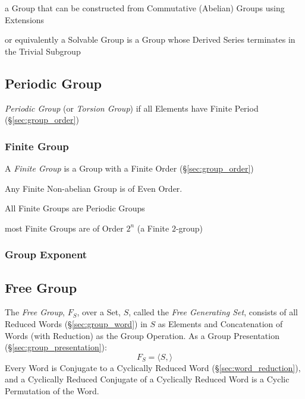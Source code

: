 a Group that can be constructed from Commutative (Abelian) Groups using
Extensions

or equivalently a Solvable Group is a Group whose Derived Series terminates in
the Trivial Subgroup



\subsection{Periodic Group}\label{sec:periodic_group}

\emph{Periodic Group} (or \emph{Torsion Group}) if all Elements have
Finite Period (\S\ref{sec:group_order})



\subsubsection{Finite Group}\label{sec:finite_group}

A \emph{Finite Group} is a Group with a Finite Order (\S\ref{sec:group_order})

Any Finite Non-abelian Group is of Even Order.

All Finite Groups are Periodic Groups

most Finite Groups are of Order $2^n$ (a Finite $2$-group)



\subsubsection{Group Exponent}\label{sec:group_exponent}



\subsection{Free Group}\label{sec:free_group}

The \emph{Free Group}, $F_S$, over a Set, $S$, called the \emph{Free Generating
  Set}, consists of all Reduced Words (\S\ref{sec:group_word}) in $S$ as
Elements and Concatenation of Words (with Reduction) as the Group Operation. As
a Group Presentation (\S\ref{sec:group_presentation}):
\[
    F_S = \langle S, \rangle
\]
Every Word is Conjugate to a Cyclically Reduced Word
(\S\ref{sec:word_reduction}), and a Cyclically Reduced Conjugate of a
Cyclically Reduced Word is a Cyclic Permutation of the Word.

